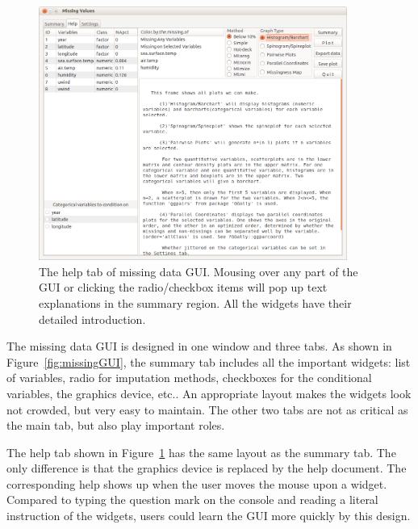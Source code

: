 \documentclass[article]{jss}
\begin{document}
\begin{center}
\begin{figure}[h]
\begin{centering}
\includegraphics[width=0.9\textwidth]{graph/fig1-GUI-tab2}
\par\end{centering}
\caption{The help tab of missing data GUI. Mousing over any part of the GUI or clicking the radio/checkbox items will pop up text explanations in the summary region. All the widgets have their detailed introduction.}
\label{fig: missingGUI-help}
\end{figure}
\par\end{center}

The missing data GUI is designed in one window and three tabs. As shown in Figure~\ref{fig:missingGUI}, the summary tab includes all the important widgets: list of variables, radio for imputation methods, checkboxes for the conditional variables, the graphics device, etc.. An appropriate layout makes the widgets look not crowded, but very easy to maintain. The other two tabs are not as critical as the main tab, but also play important roles.

The help tab shown in Figure~\ref{fig: missingGUI-help} has the same layout as the summary tab. The only difference is that the graphics device is replaced by the help document. The corresponding help shows up when the user moves the mouse upon a widget. Compared to typing the question mark on the console and reading a literal instruction of the widgets, users could learn the GUI more quickly by this design.
\end{document}
